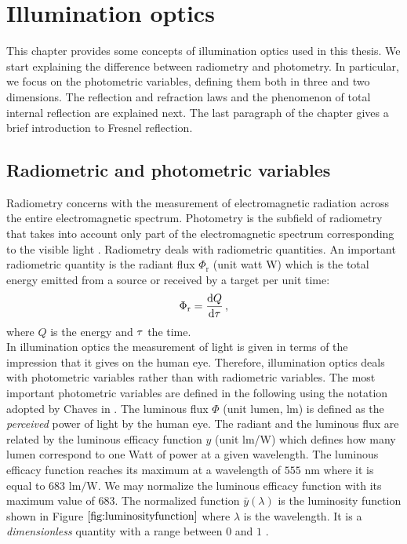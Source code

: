 \chapter{Illumination optics}\label{chap:Illumination optics}
This chapter provides some concepts of illumination optics used in this thesis. We start explaining the difference between radiometry and photometry.
In particular, we focus on the photometric variables, defining them both in three and two dimensions. The reflection and refraction laws and the phenomenon of total internal reflection are explained next. The last paragraph of the chapter gives a brief introduction to Fresnel reflection. 
\section{Radiometric and photometric variables}\label{sec:photometry}
Radiometry concerns with the measurement of electromagnetic radiation across the entire electromagnetic spectrum. Photometry is the subfield of radiometry that takes into account only part of the electromagnetic spectrum corresponding to the visible light \cite{zalewski1995radiometry}. Radiometry deals with radiometric quantities. An important radiometric quantity  is the radiant flux $\Phi_{\textrm{r}}$ (unit watt \textrm{W}) which is the total energy emitted from a source or received by a target per unit time:
\begin{equation}
\Phi_{\textrm{r}} = \frac{\textrm{d}Q}{\textrm{d}\tau}\,,
\end{equation}
where $Q$ is the energy and $\tau$ the time.\\
\indent In illumination optics the measurement of light is given in terms of the impression that it gives on the human eye. Therefore, illumination optics deals with photometric variables rather than with radiometric variables. The most important photometric variables are defined in the following using the notation adopted by Chaves in \cite{chaves2015introduction}. The luminous flux $\Phi$ (unit lumen, \textrm{lm}) is defined as the \textit{perceived} power of light by the human eye.
 The radiant and the luminous flux are related by the luminous efficacy function $y$ (unit \textrm{lm}/\textrm{W}) which defines how many lumen correspond to one Watt of power at a given wavelength.
 The luminous efficacy function reaches its maximum  at a wavelength of $555$ $\textrm{nm}$ where it is equal to $683$ $\textrm{lm}/\textrm{W}$.
  We may normalize the luminous efficacy function with its maximum value of $683$.
  The normalized function $\bar{y}(\lambda)$ is the luminosity function shown in Figure $\ref{fig:luminosityfunction}$ where $\lambda$ is the wavelength. It is a \textit{dimensionless} quantity with a range between $0$ and $1$ \cite{schubert2005light}.
